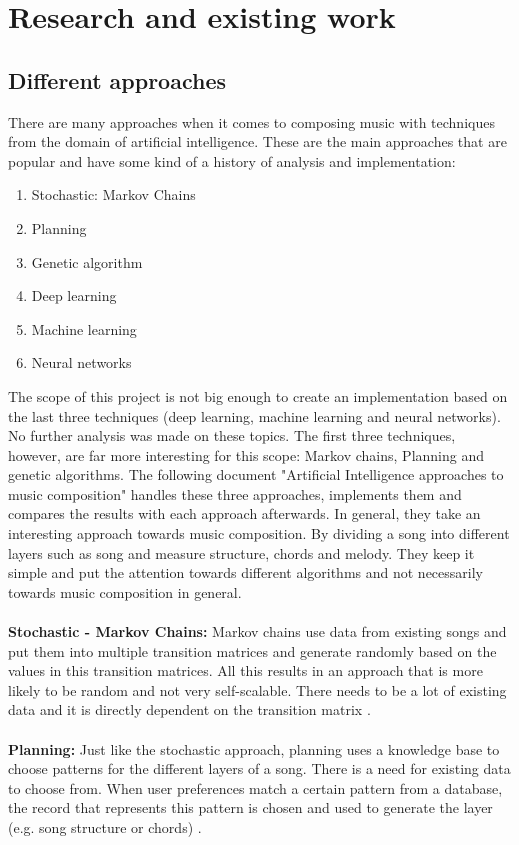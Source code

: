 \documentclass[a4paper]{article}
\begin{document}
\newpage
\section{Research and existing work}

\subsection{Different approaches}
There are many approaches when it comes to composing music with techniques from the domain of artificial intelligence. These are the main approaches that are popular and have some kind of a history of analysis and implementation:
\begin{enumerate}
	\item Stochastic: Markov Chains
	\item Planning
	\item Genetic algorithm
	\item Deep learning
	\item Machine learning
	\item Neural networks
\end{enumerate}
The scope of this project is not big enough to create an implementation based on the last three techniques (deep learning, machine learning and neural networks). No further analysis was made on these topics. The first three techniques, however, are far more interesting for this scope: Markov chains, Planning and genetic algorithms. The following document "Artificial Intelligence approaches to music composition" \cite{magma} handles these three approaches, implements them and compares the results with each approach afterwards. 
In general, they take an interesting approach towards music composition. By dividing a song into different layers such as song and measure structure, chords and melody. They keep it simple and put the attention towards different algorithms and not necessarily towards music composition in general.
\\\\
\textbf{Stochastic - Markov Chains:}
Markov chains use data from existing songs and put them into multiple transition matrices and generate randomly based on the values in this transition matrices. All this results in an approach that is more likely to be random and not very self-scalable. There needs to be a lot of existing data and it is directly dependent on the transition matrix \cite{magma}. 
\\\\
\textbf{Planning:}
Just like the stochastic approach, planning uses a knowledge base to choose patterns for the different layers of a song. There is a need for existing data to choose from. When user preferences match a certain pattern from a database, the record that represents this pattern is chosen and used to generate the layer (e.g. song structure or chords) \cite{magma}.
\end{document}
